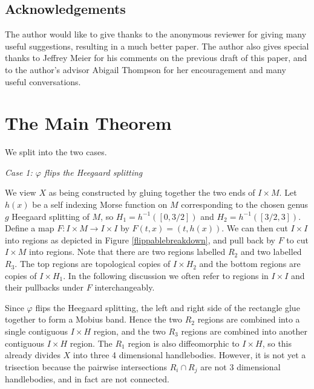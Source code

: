 \documentclass[12pt]{amsart}
\theoremstyle{definition}
\theoremstyle{remark}
\begin{document}
\subsection*{Acknowledgements} The author would like to give thanks to the anonymous reviewer for giving many useful suggestions, resulting in a much better paper.  The author also gives special thanks to  Jeffrey Meier for his comments on the previous draft of this paper, and to the author's advisor Abigail Thompson for her encouragement and many useful conversations.


\section{The Main Theorem}
\label{sec_mainthm}

We split into the two cases.

\smallskip
\noindent\textit{Case 1: $\varphi$ flips the Heegaard splitting}\ \ 

We view $X$ as being constructed by gluing together the two ends of $I \times M$.  Let $h(x)$ be a self indexing Morse function on $M$ corresponding to the chosen genus $g$ Heegaard splitting of $M$, so $H_1 = h^{-1}([0,3/2])$ and $H_2  = h^{-1}([3/2,3])$. Define a map $F\colon I \times M \to I \times I$ by $F(t,x) = (t,h(x))$.  We can then cut $I \times I$ into regions as depicted in Figure \ref{flippablebreakdown}, and pull back by $F$ to cut $I \times M$ into regions.  Note that there are two regions labelled $R_2$ and two labelled $R_3$.  The top regions are topological copies of $I \times H_2$ and the bottom regions are copies of $I \times H_1$.  In the following discussion we often refer to regions in $I \times I$ and their pullbacks under $F$ interchangeably.

Since $\varphi$ flips the Heegaard splitting, the left and right side of the rectangle glue together to form a Mobius band.  Hence the two $R_2$ regions are combined into a single contiguous $I \times H$ region, and the two $R_3$ regions are combined into another contiguous $I \times H$ region.  The $R_1$ region is also diffeomorphic to $I \times H$, so this already divides $X$ into three 4 dimensional handlebodies.  However, it is not yet a trisection because the pairwise intersections $R_i \cap R_j$ are not 3 dimensional handlebodies, and in fact are not connected.
\end{document}
